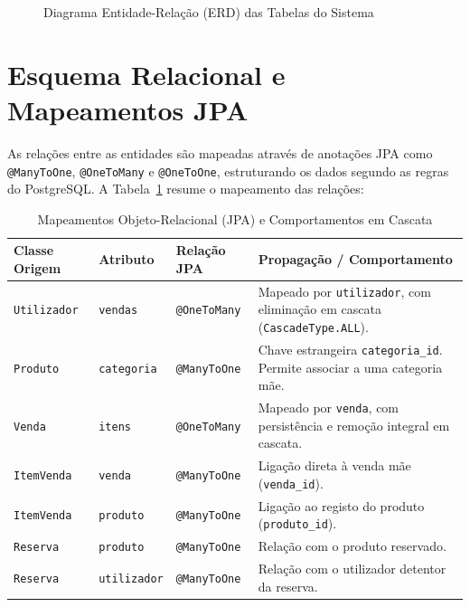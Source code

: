 \documentclass[11pt,a4paper,oneside]{report}
\begin{document}
\begin{figure}[h!]
\caption{Diagrama Entidade-Relação (ERD) das Tabelas do Sistema}
\label{fig:erd}
\end{figure}

\section{Esquema Relacional e Mapeamentos JPA}
As relações entre as entidades são mapeadas através de anotações JPA como \texttt{@ManyToOne}, \texttt{@OneToMany} e \texttt{@OneToOne}, estruturando os dados segundo as regras do PostgreSQL. A Tabela~\ref{tab:mapeamentos} resume o mapeamento das relações:

\begin{table}[h!]
\centering
\begin{tabular}{lllp{6.5cm}}
\toprule
\textbf{Classe Origem} & \textbf{Atributo} & \textbf{Relação JPA} & \textbf{Propagação / Comportamento} \\ \midrule
\texttt{Utilizador} & \texttt{vendas} & \texttt{@OneToMany} & Mapeado por \texttt{utilizador}, com eliminação em cascata (\texttt{CascadeType.ALL}). \\
\texttt{Produto} & \texttt{categoria} & \texttt{@ManyToOne} & Chave estrangeira \texttt{categoria\_id}. Permite associar a uma categoria mãe. \\
\texttt{Venda} & \texttt{itens} & \texttt{@OneToMany} & Mapeado por \texttt{venda}, com persistência e remoção integral em cascata. \\
\texttt{ItemVenda} & \texttt{venda} & \texttt{@ManyToOne} & Ligação direta à venda mãe (\texttt{venda\_id}). \\
\texttt{ItemVenda} & \texttt{produto} & \texttt{@ManyToOne} & Ligação ao registo do produto (\texttt{produto\_id}). \\
\texttt{Reserva} & \texttt{produto} & \texttt{@ManyToOne} & Relação com o produto reservado. \\
\texttt{Reserva} & \texttt{utilizador} & \texttt{@ManyToOne} & Relação com o utilizador detentor da reserva. \\ \bottomrule
\end{tabular}
\caption{Mapeamentos Objeto-Relacional (JPA) e Comportamentos em Cascata}
\label{tab:mapeamentos}
\end{table}
\end{document}
